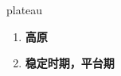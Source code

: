 
\begin{frame}
{\huge plateau}
\begin{center}
\begin{enumerate}\Large
  \item \textbf{高原}
  \item \textbf{稳定时期，平台期}
\end{enumerate}
\end{center}
\end{frame}
